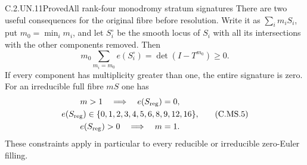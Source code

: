 \begin{statement}{C.2.UN.11}{Proved}{All rank-four monodromy stratum signatures}
There are two useful consequences for the original
fibre before resolution. Write it as $\sum_i m_iS_i$,
put $m_0=\min_i m_i$, and let $S_i^\circ$ be the
smooth locus of $S_i$ with all its intersections
with the other components removed. Then
\[
 m_0\sum_{m_i=m_0}e(S_i^\circ)
                    =\det(I-T^{m_0})\ge0.        \tag{C.MS.4}
\]
If every component has multiplicity greater than
one, the entire signature is zero. For an
irreducible full fibre $mS$ one has
\[
 \begin{gathered}
 m>1\quad\Longrightarrow\quad e(S_{\rm reg})=0,\\
 e(S_{\rm reg})\in
       \{0,1,2,3,4,5,6,8,9,12,16\},\\
 e(S_{\rm reg})>0\quad\Longrightarrow\quad m=1.
 \end{gathered}                                  \tag{C.MS.5}
\]
These constraints apply in particular to every
reducible or irreducible zero-Euler filling.
\end{statement}
